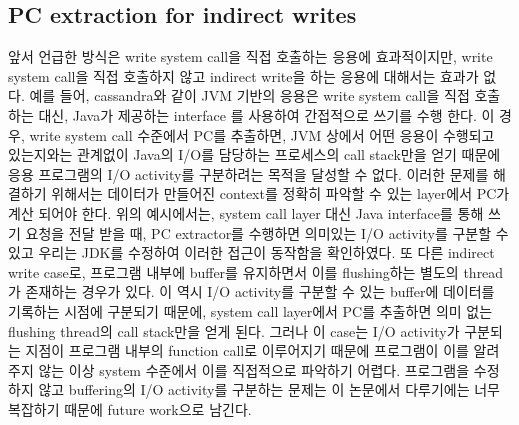 \subsection{PC extraction for indirect writes}
{\color{blue}
앞서 언급한 방식은 write system call을 직접 호출하는 응용에 효과적이지만,
write system call을 직접 호출하지 않고 indirect write을 하는 응용에 대해서는 효과가 없다.
예를 들어, cassandra와 같이 JVM 기반의 응용은 write system call을 직접 호출하는 대신, Java가 제공하는 interface
를 사용하여 간접적으로 쓰기를 수행 한다.
이 경우, write system call 수준에서 PC를 추출하면, JVM 상에서 어떤 응용이 수행되고 있는지와는 관계없이 Java의
I/O를 담당하는 프로세스의 call stack만을 얻기 때문에 응용 프로그램의 I/O activity를 구분하려는 목적을 달성할 수 없다.
이러한 문제를 해결하기 위해서는 데이터가 만들어진 context를 정확히 파악할 수 있는 layer에서 PC가 계산 되어야 한다.
위의 예시에서는, system call layer 대신 Java interface를 통해 쓰기 요청을 전달 받을 때, PC extractor를 수행하면 의미있는
I/O activity를 구분할 수 있고 우리는 JDK를 수정하여 이러한 접근이 동작함을 확인하였다.
또 다른 indirect write case로, 프로그램 내부에 buffer를 유지하면서 이를 flushing하는 별도의 thread가 존재하는 경우가 있다.
이 역시 I/O activity를 구분할 수 있는 buffer에 데이터를 기록하는 시점에 구분되기 때문에, system call layer에서 PC를 추출하면 
의미 없는 flushing thread의 call stack만을 얻게 된다. 
그러나 이 case는 I/O activity가 구분되는 지점이 프로그램 내부의 function call로 이루어지기 때문에 프로그램이 이를 
알려주지 않는 이상 system 수준에서 이를 직접적으로 파악하기 어렵다. 
프로그램을 수정하지 않고 buffering의 I/O activity를 구분하는 문제는 이 논문에서 다루기에는
너무 복잡하기 때문에 future work으로 남긴다.
}


